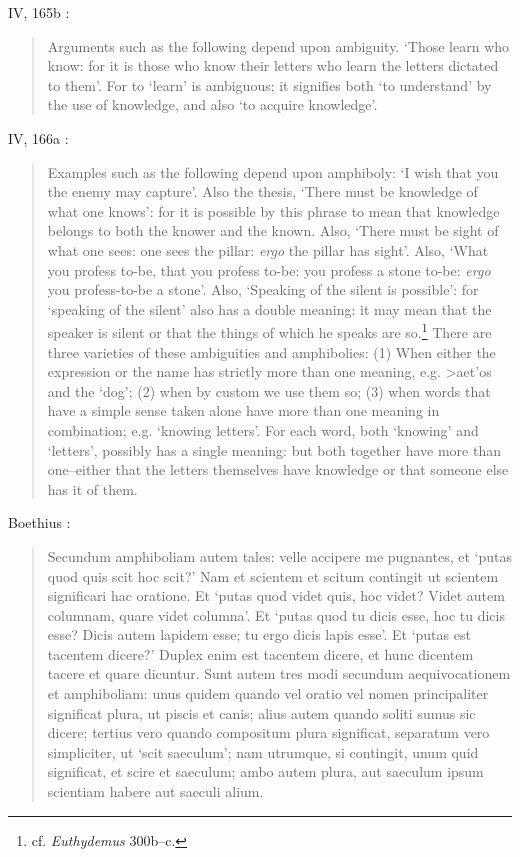\documentclass{article}
\newcommand{\textgreek}[1]{\begingroup\fontencoding{LGR}\selectfont#1\endgroup}
\begin{document}
IV, 165b \cite{pickard-cambridge}:

\begin{quote}
Arguments such as the following depend upon ambiguity. `Those learn who know: for it is those who know their letters who learn the letters dictated to them'. For to `learn' is ambiguous; it signifies both `to understand' by the use of knowledge, and also `to acquire knowledge'.
\end{quote}

IV, 166a \cite{pickard-cambridge}:

\begin{quote}
Examples such as the following depend upon amphiboly: `I wish that you the enemy may capture'. Also the thesis, `There must be knowledge of what one knows': for it is possible by this phrase to mean that knowledge belongs to both the knower and the known. Also, `There must be sight of what one sees: one sees the pillar: {\em ergo} the pillar has sight'. Also, `What you profess to-be, that you profess to-be: you profess a stone to-be: {\em ergo} you profess-to-be a stone'. Also, `Speaking of the silent is possible': for `speaking of the silent' also has a double meaning: it may mean that the speaker is silent or that the things of which he speaks are so.\footnote{cf. {\em Euthydemus} 300b--c.} There are three varieties of these ambiguities and amphibolies: (1) When either the expression or the name has strictly more than one meaning, e.g. \textgreek{>aet'os} and the `dog'; (2) when by custom we use them so; (3) when words that have a simple sense taken alone have more than one meaning in combination; e.g. `knowing letters'. For each word, both `knowing' and `letters', possibly has a single meaning: but both together have more than one--either that the letters themselves have knowledge or that someone else has it of them. 
\end{quote}

Boethius \cite[p.~9]{ALVI1to3}:

\begin{quote}
Secundum amphiboliam autem
tales: velle accipere me pugnantes, et `putas quod quis scit
hoc scit?' Nam et scientem et scitum contingit ut scientem
significari hac oratione. Et `putas quod videt quis, hoc videt?
Videt autem columnam, quare videt columna'. Et `putas quod
tu dicis esse, hoc tu dicis esse? Dicis autem lapidem esse; tu
ergo dicis lapis esse'. Et `putas est tacentem dicere?' Duplex
enim est tacentem dicere, et hunc dicentem tacere et quare dicuntur.
Sunt autem tres modi secundum aequivocationem et
amphiboliam: unus quidem quando vel oratio vel nomen principaliter
significat plura, ut piscis et canis; alius autem quando
soliti sumus sic dicere; tertius vero quando compositum plura
significat, separatum vero simpliciter, ut `scit saeculum'; nam
utrumque, si contingit, unum quid significat, et scire et saeculum;
ambo autem plura, aut saeculum ipsum scientiam habere
aut saeculi alium.
\end{quote}
\end{document}
